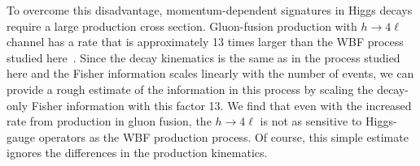 To overcome this disadvantage, momentum-dependent signatures in Higgs
decays require a large production cross section. Gluon-fusion
production with $h \to 4\ell$ channel has a rate that is approximately
13 times larger than the WBF process studied
here~\cite{deFlorian:2016spz}. Since the decay kinematics is the same
as in the process studied here and the Fisher information scales
linearly with the number of events, we can provide a rough estimate of
the information in this process by scaling the decay-only Fisher
information with this factor 13. We find that even with the increased
rate from production in gluon fusion, the $h \to 4 \ell$ is not as
sensitive to Higgs-gauge operators as the WBF production process. Of
course, this simple estimate ignores the differences in the production
kinematics.









